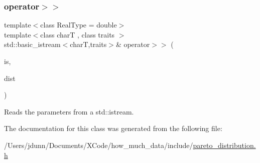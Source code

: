 \subsubsection{\texorpdfstring{operator$>$$>$}{operator>>}}
{\footnotesize\ttfamily template$<$class Real\+Type  = double$>$ \\
template$<$class charT , class traits $>$ \\
std\+::basic\+\_\+istream$<$charT,traits$>$\& operator$>$$>$ (\begin{DoxyParamCaption}\item[{std\+::basic\+\_\+istream$<$ charT, traits $>$ \&}]{is,  }\item[{\mbox{\hyperlink{classpareto__distribution}{pareto\+\_\+distribution}}$<$ Real\+Type $>$ \&}]{dist }\end{DoxyParamCaption})\hspace{0.3cm}{\ttfamily [friend]}}



Reads the parameters from a std\+::istream. 



The documentation for this class was generated from the following file\+:\begin{DoxyCompactItemize}
\item 
/\+Users/jdunn/\+Documents/\+X\+Code/how\+\_\+much\+\_\+data/include/\mbox{\hyperlink{pareto__distribution_8h}{pareto\+\_\+distribution.\+h}}\end{DoxyCompactItemize}
